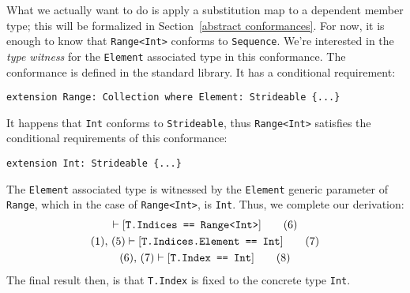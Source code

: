 \documentclass[../generics]{subfiles}
\begin{document}
\begin{example}
What we actually want to do is apply a substitution map to a dependent member type; this will be formalized in Section~\ref{abstract conformances}. For now, it is enough to know that \texttt{Range<Int>} conforms to \texttt{Sequence}. We're interested in the \emph{type witness} for the \texttt{Element} associated type in this conformance. The conformance is defined in the standard library. It has a conditional requirement:
\begin{Verbatim}
extension Range: Collection where Element: Strideable {...}
\end{Verbatim}
It happens that \texttt{Int} conforms to \texttt{Strideable}, thus \texttt{Range<Int>} satisfies the conditional requirements of this conformance:
\begin{Verbatim}
extension Int: Strideable {...}
\end{Verbatim}
The \texttt{Element} associated type is witnessed by the \texttt{Element} generic parameter of \texttt{Range}, which in the case of \texttt{Range<Int>}, is \texttt{Int}. Thus, we complete our derivation:
\begin{gather}
\vdash [\texttt{T.Indices == Range<Int>}]\tag{6}\\
(1),\,(5)\vdash [\texttt{T.Indices.Element == Int}]\tag{7}\\
(6),\,(7)\vdash [\texttt{T.Index == Int}]\tag{8}
\end{gather}
The final result then, is that \texttt{T.Index} is fixed to the concrete type \texttt{Int}.
\end{example}
\end{document}
